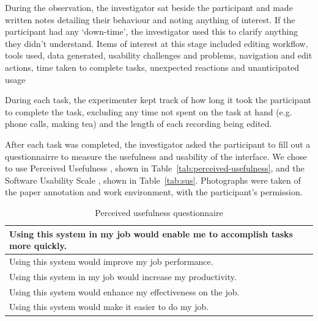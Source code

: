 During the observation, the investigator sat beside the participant and made written notes detailing their behaviour
and noting anything of interest. If the participant had any `down-time', the investigator used this to clarify anything
they didn't understand. Items of interest at this stage included editing workflow, tools used, data generated,
usability challenges and problems, navigation and edit actions, time taken to complete tasks, unexpected reactions and
unanticipated usage

During each task, the experimenter kept track of how long it took the participant to complete the task, excluding any
time not spent on the task at hand (e.g. phone calls, making tea) and the length of each recording being
edited.


After each task was completed, the investigator asked the participant to fill out a questionnairre to measure the
usefulness and usability of the interface. We chose to use Perceived Usefulness \citep{Davis1989}, shown in
Table~\ref{tab:perceived-usefulness}, and the Software Usability Scale \citep{Brooke1996}, shown in Table~\ref{tab:sus}.
Photographs were taken of the paper annotation and work environment, with the participant's permission.

\begin{table}
  {\small
    \begin{tabular}{ | l | }
      \hline
      Using this system in my job would enable me to accomplish tasks more quickly. \\ \hline
      Using this system would improve my job performance. \\ \hline
      Using this system in my job would increase my productivity. \\ \hline
      Using this system would enhance my effectiveness on the job. \\ \hline
      Using this system would make it easier to do my job. \\
      \hline
    \end{tabular}
  }
  \caption{Perceived usefulness questionnaire \citep{Davis1989}}
  \label{tab:usefulness}
\end{table}

